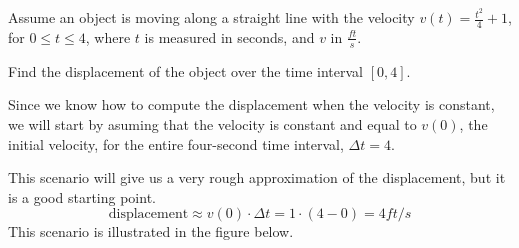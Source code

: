 \documentclass{ximera}
\begin{document}
\begin{example}
  Assume an object is moving along a straight line with the velocity
  $v(t)=\frac{t^2}{4}+1$, for $0\le t\le4$, where $t$ is measured in
  seconds, and $v$ in $\frac{\unit{ft}}{\unit{s}}$.
  
  Find the displacement of the object over the time interval $[0,4]$. 
  \begin{explanation}
   Since we know how to compute the displacement when the velocity is
   constant, we will start by asuming that the velocity is constant
   and equal to $v(0)$, the initial velocity, for the entire
   four-second time interval, $\Delta t=4$.
   
   This scenario will give us a very rough approximation of the
   displacement, but it is a good starting point.
  \[
   \text{displacement}\approx v(0)\cdot\Delta t=1\cdot(4-0)=4 \unit{ft}/\unit{s}
  \]
This scenario is illustrated in the figure below.
 \begin{image}
\end{image}
\end{explanation}
\end{example}
\end{document}
